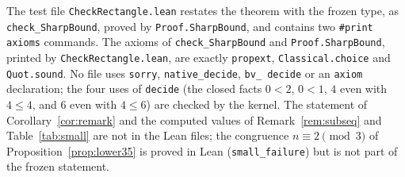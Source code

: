 \documentclass[11pt]{article}
\theoremstyle{definition}
\theoremstyle{remark}
\begin{document}
{\noindent The test file \texttt{CheckRectangle.lean} restates the theorem
with the frozen type, as \texttt{check\_\allowbreak SharpBound}, proved by
\texttt{Proof.SharpBound}, and contains two \texttt{\#print axioms}
commands. The axioms of
\texttt{check\_\allowbreak SharpBound} and \texttt{Proof.SharpBound}, printed
by \texttt{CheckRectangle.lean}, are exactly \texttt{propext},
\texttt{Classical.choice} and \texttt{Quot.sound}. No file uses
\texttt{sorry}, \texttt{native\_\allowbreak decide}, \texttt{bv\_\allowbreak
decide} or an \texttt{axiom} declaration; the four uses of \texttt{decide}
(the closed facts $0<2$, $0<1$, $4$ even with $4\le4$, and $6$ even with
$4\le6$) are checked by the kernel. The statement of
Corollary~\ref{cor:remark} and the computed values
of Remark~\ref{rem:subseq} and Table~\ref{tab:small} are not in the Lean
files; the congruence $n\equiv2\pmod3$ of Proposition~\ref{prop:lower35} is
proved in Lean (\texttt{small\_\allowbreak failure}) but is not part of the
frozen statement.

}
\end{document}
